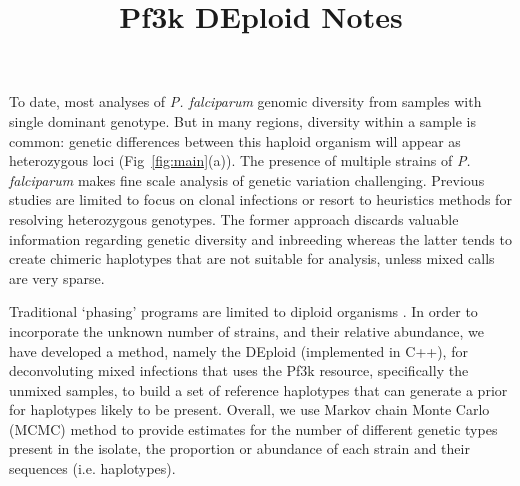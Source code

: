 \documentclass{article}
\title{Pf3k DEploid Notes}
\author{ }
\date{}
\begin{document}
\maketitle

To date, most analyses of {\it P. falciparum} genomic diversity from samples with single dominant genotype.  But in many regions, diversity within a sample is common: genetic differences between this haploid organism will appear as heterozygous loci (Fig~\ref{fig:main}(a)). The presence of multiple strains of {\it P. falciparum} makes fine scale
analysis of genetic variation challenging. Previous studies are limited to focus on clonal infections or resort to heuristics methods for resolving heterozygous genotypes. The former
approach discards valuable information regarding genetic diversity and inbreeding whereas the latter tends to create chimeric haplotypes that are not suitable for analysis, unless mixed calls are very sparse.

Traditional ‘phasing’ programs are limited to diploid organisms \citep{Browning2007, Howie2009}. In order to incorporate the unknown number of strains, and their relative abundance, we have developed a method, namely the DEploid (implemented in C++), for deconvoluting mixed infections that uses the Pf3k resource, specifically the unmixed samples, to build a set of reference haplotypes that can generate a prior for haplotypes likely to be present. Overall, we use Markov chain Monte Carlo (MCMC) method to provide estimates for the number of different genetic types present in the isolate, the proportion or abundance of each strain and their sequences (i.e. haplotypes).
\end{document}
